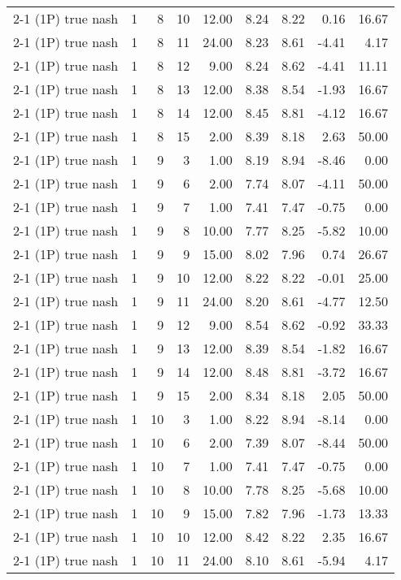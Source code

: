 \begin{tabular}{lrrrrrrrr}
2-1 (1P) true nash & 1 & 8 & 10 & 12.00 & 8.24 & 8.22 & 0.16 & 16.67 \\
2-1 (1P) true nash & 1 & 8 & 11 & 24.00 & 8.23 & 8.61 & -4.41 & 4.17 \\
2-1 (1P) true nash & 1 & 8 & 12 & 9.00 & 8.24 & 8.62 & -4.41 & 11.11 \\
2-1 (1P) true nash & 1 & 8 & 13 & 12.00 & 8.38 & 8.54 & -1.93 & 16.67 \\
2-1 (1P) true nash & 1 & 8 & 14 & 12.00 & 8.45 & 8.81 & -4.12 & 16.67 \\
2-1 (1P) true nash & 1 & 8 & 15 & 2.00 & 8.39 & 8.18 & 2.63 & 50.00 \\
2-1 (1P) true nash & 1 & 9 & 3 & 1.00 & 8.19 & 8.94 & -8.46 & 0.00 \\
2-1 (1P) true nash & 1 & 9 & 6 & 2.00 & 7.74 & 8.07 & -4.11 & 50.00 \\
2-1 (1P) true nash & 1 & 9 & 7 & 1.00 & 7.41 & 7.47 & -0.75 & 0.00 \\
2-1 (1P) true nash & 1 & 9 & 8 & 10.00 & 7.77 & 8.25 & -5.82 & 10.00 \\
2-1 (1P) true nash & 1 & 9 & 9 & 15.00 & 8.02 & 7.96 & 0.74 & 26.67 \\
2-1 (1P) true nash & 1 & 9 & 10 & 12.00 & 8.22 & 8.22 & -0.01 & 25.00 \\
2-1 (1P) true nash & 1 & 9 & 11 & 24.00 & 8.20 & 8.61 & -4.77 & 12.50 \\
2-1 (1P) true nash & 1 & 9 & 12 & 9.00 & 8.54 & 8.62 & -0.92 & 33.33 \\
2-1 (1P) true nash & 1 & 9 & 13 & 12.00 & 8.39 & 8.54 & -1.82 & 16.67 \\
2-1 (1P) true nash & 1 & 9 & 14 & 12.00 & 8.48 & 8.81 & -3.72 & 16.67 \\
2-1 (1P) true nash & 1 & 9 & 15 & 2.00 & 8.34 & 8.18 & 2.05 & 50.00 \\
2-1 (1P) true nash & 1 & 10 & 3 & 1.00 & 8.22 & 8.94 & -8.14 & 0.00 \\
2-1 (1P) true nash & 1 & 10 & 6 & 2.00 & 7.39 & 8.07 & -8.44 & 50.00 \\
2-1 (1P) true nash & 1 & 10 & 7 & 1.00 & 7.41 & 7.47 & -0.75 & 0.00 \\
2-1 (1P) true nash & 1 & 10 & 8 & 10.00 & 7.78 & 8.25 & -5.68 & 10.00 \\
2-1 (1P) true nash & 1 & 10 & 9 & 15.00 & 7.82 & 7.96 & -1.73 & 13.33 \\
2-1 (1P) true nash & 1 & 10 & 10 & 12.00 & 8.42 & 8.22 & 2.35 & 16.67 \\
2-1 (1P) true nash & 1 & 10 & 11 & 24.00 & 8.10 & 8.61 & -5.94 & 4.17 \\

\end{tabular}
